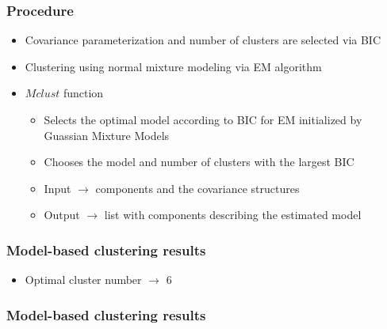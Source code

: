 \documentclass{beamer}
\begin{document}
\begin{frame}
\frametitle{Procedure}
\begin{center}
\begin{itemize}
\item Covariance parameterization and number of clusters are selected via BIC
\item Clustering using normal mixture modeling via EM algorithm
\item $Mclust$ function 
\begin{itemize}
\item Selects the optimal model according to BIC for EM initialized by Guassian Mixture Models
\item Chooses the model and number of clusters with the largest BIC
\item Input $\rightarrow$ components and the covariance structures
\item Output $\rightarrow$ list with components describing the estimated model
\end{itemize}
\end{itemize}
  
\end{center}
\end{frame}




\begin{frame}
\frametitle{Model-based clustering results}
\begin{center}
\begin{itemize}
\item Optimal cluster number $\rightarrow$ 6
\end{itemize}
\end{center}
\end{frame}



\begin{frame}
\frametitle{Model-based clustering results}
\begin{center}

\end{center}
\end{frame}
















\end{document}
